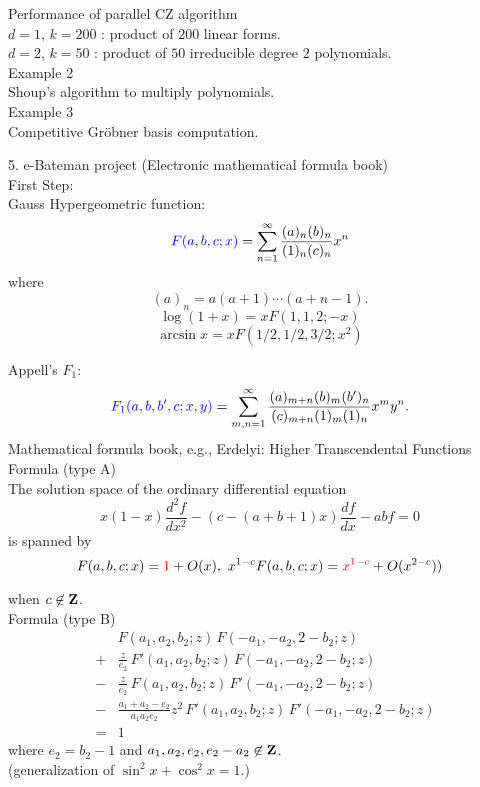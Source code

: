 \documentclass{slides}
\begin{document}
\epsfxsize=17cm

\noindent
{\color{blue} Performance of parallel CZ algorithm} \\
$d=1$, $k=200$ : product of $200$ linear forms. \\
$d=2$, $k=50$ : product of $50$ irreducible degree $2$ polynomials. \\

\newpage
{\color{green} Example 2} \\
Shoup's algorithm to multiply polynomials.  \\
{\color{green} Example 3} \\
Competitive Gr\"obner basis computation. \\
\newpage

\noindent
{\color{red} 5. e-Bateman project} (Electronic mathematical formula book)\\
First Step: \\
Gauss Hypergeometric function:
$$ {\color{blue} F(a,b,c;x)} = \sum_{n=1}^\infty
  \frac{(a)_n (b)_n}{(1)_n (c)_n} x^n
$$
where
$$ (a)_n = a(a+1) \cdots (a+n-1). $$
{\color{green}
$$ \log (1+x) = x F(1,1,2;-x) $$
$$ \arcsin x = x F(1/2,1/2,3/2;x^2) $$
}

\noindent
Appell's $F_1$:
$$ {\color{blue} F_1(a,b,b',c;x,y)} = \sum_{m,n=1}^\infty
  \frac{(a)_{m+n} (b)_m (b')_n}{(c)_{m+n}(1)_m (1)_n} x^m y^n.
$$
\newpage
Mathematical formula book, e.g.,
Erdelyi: {\color{green} Higher Transcendental Functions} \\
{\color{blue} Formula (type A)}\\
The solution space of the ordinary differential equation
$$ x(1-x) \frac{d^2f}{dx^2} -\left( c-(a+b+1)x \right) \frac{df}{dx} - a b f = 0$$
is spanned by
$$ F(a,b,c;x) = {\color{red}1} + O(x), \  
   x^{1-c} F(a,b,c;x) = {\color{red}x^{1-c}}+O(x^{2-c}))$$

when $c \not\in {\bf Z}$. \\
{\color{blue} Formula (type B)}\\
\begin{eqnarray*}
&\ & F(a_1, a_2, b_2;z) \, F(-a_1,-a_2,2-b_2;z)  \\
&+& \frac{z}{e_2}\, F'(a_1, a_2, b_2;z) \, F(-a_1,-a_2,2-b_2;z)  \\
&-& \frac{z}{e_2}\, F(a_1, a_2, b_2;z) \, F'(-a_1,-a_2,2-b_2;z)  \\
&-& \frac{a_1+a_2-e_2}{a_1 a_2 e_2}z^2\,
  F'(a_1, a_2, b_2;z)\,F'(-a_1,-a_2,2-b_2;z) \\
&=& 1
\end{eqnarray*}
where $e_2 = b_2-1$ and $a_1, a_2, e_2, e_2-a_2 \not\in {\bf Z}$.  \\
(generalization of $\sin^2 x + \cos^2 x =1$.)
\end{document}
